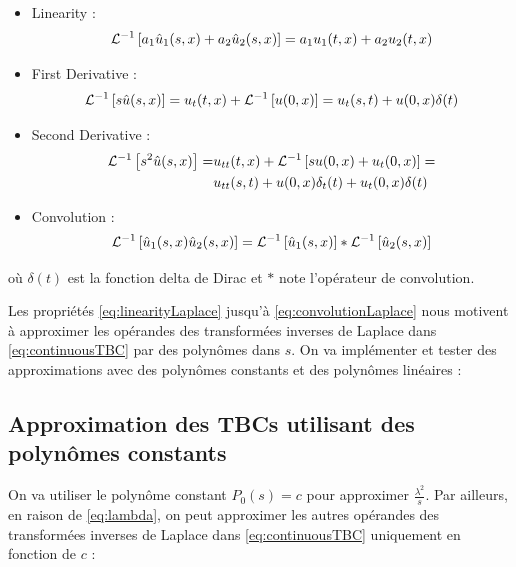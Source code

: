 \begin{itemize}
	\item Linearity :
		\begin{equation}
			\label{eq:linearityLaplace}
				\mathcal{L}^{-1} \left[a_1\hat{u}_1(s,x) + a_2\hat{u}_2(s,x)\right] = a_1u_1(t,x) + a_2u_2(t,x)
		\end{equation}
	\item First Derivative : 
		\begin{equation}
			\label{eq:firstDerivativeLaplace}
			\mathcal{L}^{-1} \left[ s\hat{u}(s,x) \right] = u_t(t,x) + \mathcal{L}^{-1} \left[ u(0,x) \right] =  u_t(s,t) +  u(0,x) \delta (t)
		\end{equation}
	\item Second Derivative : 
		\begin{equation}
			\label{eq:secondDerivativeLaplace}
			\begin{aligned}
			\mathcal{L}^{-1} \left[ s^2\hat{u}(s,x) \right] = & u_{tt}(t,x) + \mathcal{L}^{-1} \left[ su(0,x) + u_{t}(0,x)\right] = \\
																		   & u_{tt}(s,t) + u(0,x)\delta_t(t) +  u_t(0,x)\delta (t)
			\end{aligned}
		\end{equation}
	\item Convolution :
	\begin{equation}
		\label{eq:convolutionLaplace}
		\mathcal{L}^{-1} \left[ \hat{u}_1(s,x)\hat{u}_2(s,x)\right] = \mathcal{L}^{-1} \left[ \hat{u}_1(s,x)\right] * \mathcal{L}^{-1} \left[ \hat{u}_2(s,x)\right]
	\end{equation}
\end{itemize} 

\noindent où $\delta (t)$ est la fonction delta de Dirac et $*$ note l'opérateur de convolution.

\indent Les propriétés \eqref{eq:linearityLaplace} jusqu'à \eqref{eq:convolutionLaplace} nous motivent à approximer les opérandes des transformées inverses de Laplace dans \eqref{eq:continuousTBC} par des polynômes dans $s$. On va implémenter et tester des approximations avec des polynômes constants et des polynômes linéaires :

\subsection{Approximation des TBCs utilisant des polynômes constants}

\indent On va utiliser le polynôme constant $P_0(s) = c$  pour approximer $\frac{\lambda^2}{s}$. Par ailleurs, en raison de \eqref{eq:lambda}, on peut approximer les autres opérandes des transformées inverses de Laplace dans \eqref{eq:continuousTBC} uniquement en fonction de $c$ :

